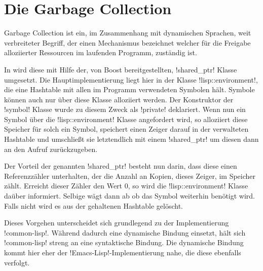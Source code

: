 \section{Die Garbage Collection}
\label{sec:shared_ptr}

Garbage Collection ist ein, im Zusammenhang mit dynamischen Sprachen, weit verbreiteter Begriff, der
einen Mechanismus bezeichnet welcher für die Freigabe alloziierter Ressourcen im laufenden Programm, zuständig
ist.

In \projectname{} wird diese mit Hilfe der, von Boost bereitgestellten, !shared_ptr! Klasse umgesetzt.
Die Hauptimplementierung liegt hier in der Klasse !lisp::environment!, die eine Hashtable mit allen
im Programm verwendeten Symbolen hält. Symbole können auch nur über diese Klasse alloziiert werden. Der
Konstruktor der !symbol! Klasse wurde zu diesem Zweck als !private! deklariert.
Wenn nun ein Symbol über die !lisp::environment! Klasse angefordert wird, so alloziiert diese
Speicher für solch ein Symbol, speichert einen Zeiger darauf in der verwalteten Hashtable
und umschließt sie letztendlich mit einem !shared_ptr! um diesen dann an den Aufruf zurückzugeben.

Der Vorteil der genannten !shared_ptr! besteht nun darin, dass diese einen Referenzzähler unterhalten,
der die Anzahl an Kopien, dieses Zeiger, im Speicher zählt. Erreicht dieser Zähler den Wert 0, so
wird die !lisp::environment! Klasse daüber informiert. Selbige wägt dann ab ob das Symbol weiterhin benötigt
wird. Falls nicht wird es aus der gehaltenen Hashtable gelöscht.

Dieses Vorgehen unterscheidet sich grundlegend zu der Implementierung !common-lisp!. Während \projectname{}
dadurch eine dynamische Bindung einsetzt, hält sich !common-lisp! streng an eine syntaktische Bindung.
Die dynamische Bindung kommt hier eher der !Emacs-Lisp!-Implementierung nahe, die diese ebenfalls verfolgt.
